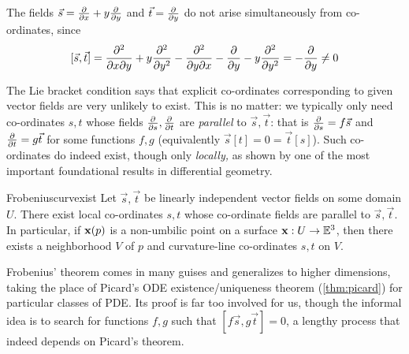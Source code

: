 \begin{example}{}{}
	The fields $\vec s=\partials x+y\partials y$ and $\vec t=\partials y$ do not arise simultaneously from co-ordinates, since
	\[
		[\vec s,\vec t]=\partials[^2]{x\partial y}+y\partials[^2]{y^2} -\partials[^2]{y\partial x}-\partials y-y\partials[^2]{y^2} =-\partials y\neq 0
	\]
\end{example}

The Lie bracket condition says that explicit co-ordinates corresponding to given vector fields are very unlikely to exist. This is no matter: we typically only need co-ordinates $s,t$ whose fields $\partials s,\partials t$ are \emph{parallel} to $\vec s,\vec t$: that is $\partials s=f\vec s$ and $\partials t=g\vec t$ for some functions $f,g$ (equivalently $\vec s[t]=0=\vec t[s]$). Such co-ordinates do indeed exist, though only \emph{locally,} as shown by one of the most important foundational results in differential geometry.

\begin{thm}{Frobenius}{curvexist}
	Let $\vec s,\vec t$ be linearly independent vector fields on some domain $U$. There exist local co-ordinates $s,t$ whose co-ordinate fields are parallel to $\vec s,\vec t$.\smallbreak
	In particular, if $\vx(p)$ is a non-umbilic point on a surface $\vx:U\to\E^3$, then there exists a neighborhood $V$ of $p$ and curvature-line co-ordinates $s,t$ on $V$.
\end{thm}

Frobenius' theorem comes in many guises and generalizes to higher dimensions, taking the place of Picard's ODE existence/uniqueness theorem (\ref{thm:picard}) for particular classes of PDE. Its proof is far too involved for us, though the informal idea is to search for functions $f,g$ such that $[f\vec s,g\vec t]=0$, a lengthy process that indeed depends on Picard's theorem.





